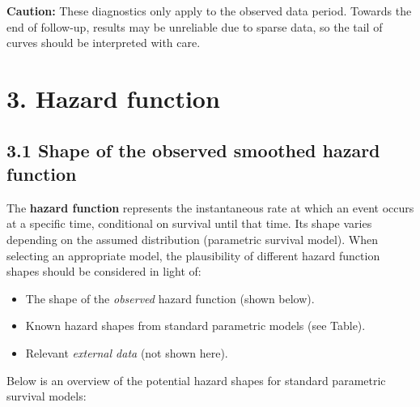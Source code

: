 \documentclass[
]{article}
\providecommand{\tightlist}{%
  \setlength{\itemsep}{0pt}\setlength{\parskip}{0pt}}
\begin{document}
\textbf{Caution:} These diagnostics only apply to the observed data
period. Towards the end of follow-up, results may be unreliable due to
sparse data, so the tail of curves should be interpreted with care.

\clearpage

\clearpage

\section{3. Hazard function}\label{hazard-function}

\subsection{3.1 Shape of the observed smoothed hazard
function}\label{shape-of-the-observed-smoothed-hazard-function}

The \textbf{hazard function} represents the instantaneous rate at which
an event occurs at a specific time, conditional on survival until that
time. Its shape varies depending on the assumed distribution (parametric
survival model). When selecting an appropriate model, the plausibility
of different hazard function shapes should be considered in light of:

\begin{itemize}
\tightlist
\item
  The shape of the \emph{observed} hazard function (shown below).
\item
  Known hazard shapes from standard parametric models (see Table).
\item
  Relevant \emph{external data} (not shown here).
\end{itemize}

Below is an overview of the potential hazard shapes for standard
parametric survival models:
\end{document}
